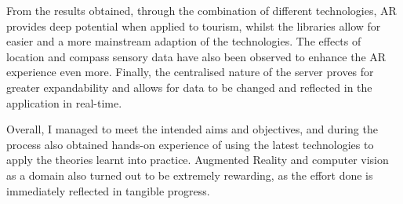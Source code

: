 From the results obtained, through the combination of different technologies, AR provides deep potential when applied to tourism, 
whilst the libraries allow for easier and a more mainstream adaption of the technologies. The effects of location and compass sensory data have 
also been observed to enhance the AR experience even more. Finally, the centralised nature of the server proves for greater expandability and allows 
for data to be changed and reflected in the application in real-time. 

Overall, I managed to meet the intended aims and objectives, and during the process also 
obtained hands-on experience of using the latest technologies to apply the theories learnt into 
practice. Augmented Reality and computer vision as a domain also turned out to be extremely rewarding, as the effort done is immediately reflected in tangible progress. 